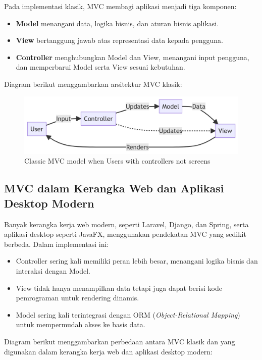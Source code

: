 Pada implementasi klasik, MVC membagi aplikasi menjadi tiga komponen:

\begin{itemize}
	\item \textbf{Model} menangani data, logika bisnis, dan aturan bisnis aplikasi.
	\item \textbf{View} bertanggung jawab atas representasi data kepada pengguna.
	\item \textbf{Controller} menghubungkan Model dan View, menangani input pengguna, dan memperbarui Model serta View sesuai kebutuhan.
\end{itemize}

Diagram berikut menggambarkan arsitektur MVC klasik:

\begin{figure}[h]
	\centering
	\includegraphics[width=\textwidth]{../images/mvc-classic.png}
	\caption{Classic MVC model when Users with controllers not screens}
	\label{fig:mvc-classic}
\end{figure}

\subsection{MVC dalam Kerangka Web dan Aplikasi Desktop Modern}

Banyak kerangka kerja web modern, seperti Laravel, Django, dan Spring, serta aplikasi desktop seperti JavaFX, menggunakan pendekatan MVC yang sedikit berbeda. Dalam implementasi ini:

\begin{itemize}
	\item Controller sering kali memiliki peran lebih besar, menangani logika bisnis dan interaksi dengan Model.
	\item View tidak hanya menampilkan data tetapi juga dapat berisi kode pemrograman untuk rendering dinamis.
	\item Model sering kali terintegrasi dengan ORM (\textit{Object-Relational Mapping}) untuk mempermudah akses ke basis data.
\end{itemize}

Diagram berikut menggambarkan perbedaan antara MVC klasik dan yang digunakan dalam kerangka kerja web dan aplikasi desktop modern:

